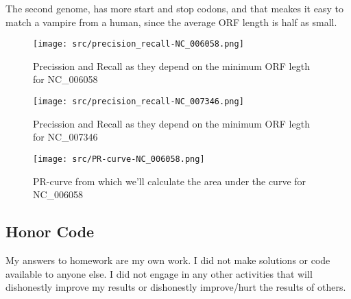 \documentclass[a4paper,11pt]{article}
\begin{document}
The second genome, has more start and stop codons, and that meakes it easy to match a vampire from a human, since the average ORF length is half as small. 



\begin{figure}[htbp]
    \begin{center}
        \texttt{[image: src/precision\_recall-NC\_006058.png]}
        \caption{Precission and Recall as they depend on the minimum ORF legth for NC\_006058}
        \label{fig-example}
    \end{center}
\end{figure}

\begin{figure}[htbp]
    \begin{center}
        \texttt{[image: src/precision\_recall-NC\_007346.png]}
        \caption{Precission and Recall as they depend on the minimum ORF legth for NC\_007346}
        \label{fig-example}
    \end{center}
\end{figure}

\begin{figure}[htbp]
    \begin{center}
        \texttt{[image: src/PR-curve-NC\_006058.png]}
        \caption{PR-curve from which we'll calculate the area under the curve for NC\_006058}
        \label{prcurve}
    \end{center}
\end{figure}





\subsection*{Honor Code}


My answers to homework are my own work. I did not make solutions or code available to anyone else. I did not engage in any other activities that will dishonestly improve my results or dishonestly improve/hurt the results of others.
\end{document}
